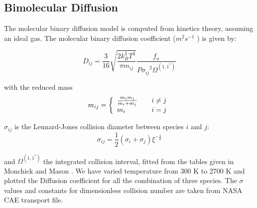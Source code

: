 \subsection{Bimolecular Diffusion}
\noindent The molecular binary diffusion model is
computed from kinetics theory, assuming an ideal gas. The molecular binary diffusion coefficient ($m^2 s^{-1}$ ) is given by:

$$D_{ij} = \frac{3}{16}\sqrt{\frac{2 k_B^3 T^3}{\pi m_{ij}}}\frac{f_n}{{ P \sigma_{ij}}^2   \Omega^{(1,1^*)}}$$

with  the reduced mass
\begin{equation}
m_{ij} = \left\{\begin{array}{l@{\qquad}l}
                \frac{m_i m_j}{m_i + m_j} &  i \neq j \\
                m_i                                  & i=j
                    \end{array}
              \right.
\end{equation}

$\sigma_{ij}$ is the Lennard-Jones collision diameter between species $i$ and $j$:
\begin{equation}
\sigma_{ij} = \frac{1}{2}\left(\sigma_i + \sigma_j\right) \xi^{-\frac{1}{6}}
\end{equation}

\noindent and $\Omega^{(1,1^*)}$ the integrated collision interval, fitted from the tables given in Monchick and Mason \cite{Monchick}. We have varied temperature from 300 K to 2700 K and plotted the Diffusion coefficient for all the combination of three species. The $\sigma$ values and constants for dimensionless collision number are taken from NASA CAE transport file. 

